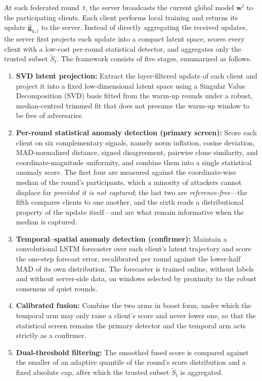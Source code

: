 \documentclass[journal]{IEEEtran}
\begin{document}
At each federated round~$t$, the server broadcasts the current global model $\mathbf{w}^t$ to the participating clients. Each client performs local training and returns its update $\hat{\mathbf{g}}_{k,t}$ to the server. Instead of directly aggregating the received updates, the server first projects each update into a compact latent space, scores every client with a low-cost per-round statistical detector, and aggregates only the trusted subset $\widetilde{S}_t$. The framework consists of five stages, summarized as follows.
\begin{enumerate}
    \item \textbf{SVD latent projection:} Extract the layer-filtered update of each client and project it into a fixed low-dimensional latent space using a Singular Value Decomposition (SVD) basis fitted from the warm-up rounds under a robust, median-centred trimmed fit that does not presume the warm-up window to be free of adversaries.
    \item \textbf{Per-round statistical anomaly detection (primary screen):} Score each client on six complementary signals, namely norm inflation, cosine deviation, MAD-normalized distance, signed disagreement, pairwise clone similarity, and coordinate-magnitude uniformity, and combine them into a single statistical anomaly score. The first four are measured against the coordinate-wise median of the round's participants, which a minority of attackers cannot displace far \emph{provided it is not captured}; the last two are \emph{reference-free}---the fifth compares clients to one another, and the sixth reads a distributional property of the update itself---and are what remain informative when the median is captured.
    \item \textbf{Temporal--spatial anomaly detection (confirmer):} Maintain a convolutional LSTM forecaster over each client's latent trajectory and score the one-step forecast error, recalibrated per round against the lower-half MAD of its own distribution. The forecaster is trained online, without labels and without server-side data, on windows selected by proximity to the robust consensus of quiet rounds.
    \item \textbf{Calibrated fusion:} Combine the two arms in boost form, under which the temporal arm may only raise a client's score and never lower one, so that the statistical screen remains the primary detector and the temporal arm acts strictly as a confirmer.
    \item \textbf{Dual-threshold filtering:} The smoothed fused score is compared against the smaller of an adaptive quantile of the round's score distribution and a fixed absolute cap, after which the trusted subset $\widetilde{S}_t$ is aggregated.
\end{enumerate}
\end{document}
